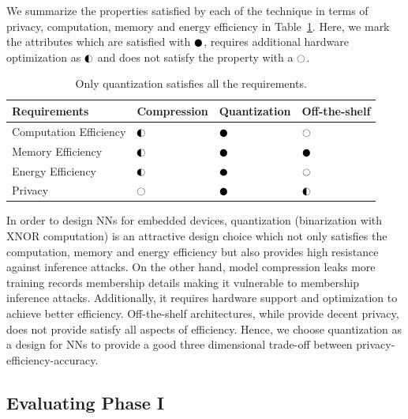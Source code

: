 We summarize the properties satisfied by each of the technique in terms of privacy, computation, memory and energy efficiency in Table~\ref{tbl:comparison}.
Here, we mark the attributes which are satisfied with $\cmark$, requires additional hardware optimization as $\smark$ and does not satisfy the property with a $\xmark$.

\begin{table}[!htb]
\begin{center}
\renewcommand\arraystretch{1.5}
\fontsize{6.7pt}{6.7pt}\selectfont
\begin{tabular}{|l||l|l|l|}
\hline
Requirements & Compression & Quantization & Off-the-shelf  \\
\hline
Computation Efficiency & $\smark$  & $\cmark$   & $\xmark$ \\
\hline
Memory Efficiency &  $\smark$ & $\cmark$   & $\cmark$ \\
\hline
Energy Efficiency &  $\smark$   & $\cmark$   & $\xmark$ \\
\hline
Privacy &  $\xmark$   & $\cmark$   & $\smark$ \\
\hline
\end{tabular}
\end{center}
\caption{Only quantization satisfies all the requirements.}
\label{tbl:comparison}
\end{table}

In order to design NNs for embedded devices, quantization (binarization with XNOR computation) is an attractive design choice which not only satisfies the computation, memory and energy efficiency but also provides high resistance against inference attacks.
On the other hand, model compression leaks more training records membership details making it vulnerable to membership inference attacks. Additionally, it requires hardware support and optimization to achieve better efficiency. Off-the-shelf architectures, while provide decent privacy, does not provide satisfy all aspects of efficiency.
Hence, we choose quantization as a design for NNs to provide a good three dimensional trade-off between privacy-efficiency-accuracy.






\subsection{Evaluating Phase I}\label{evalPh1}

